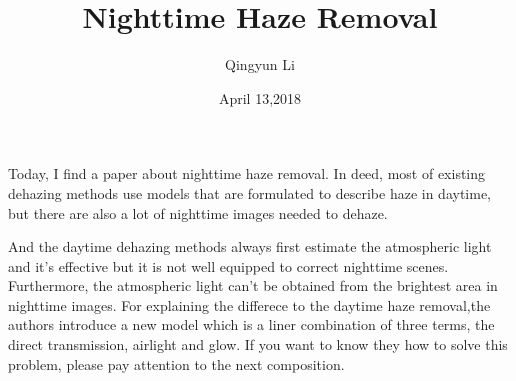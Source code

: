 \documentclass{article}
\author{Qingyun Li}
\date{April 13,2018}
\title{Nighttime Haze Removal}
\begin{document}
\maketitle
\par Today, I find a paper about nighttime haze removal. In deed, most of existing dehazing methods use models that are formulated to describe haze in daytime, but there are also a lot of nighttime images needed to dehaze. 
\par And the daytime dehazing methods always first estimate the atmospheric light and it's effective but it is not well equipped to correct nighttime scenes. Furthermore, the atmospheric light can't be obtained from the brightest area in nighttime images. For explaining the differece to the daytime haze removal,the authors introduce a new model which is a liner combination of three terms, the direct transmission, airlight and glow. If you want to know they how to solve this problem, please pay attention to the next composition.
\end{document}
